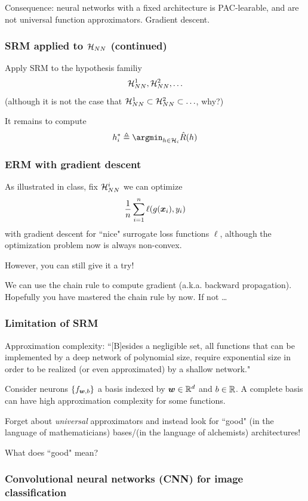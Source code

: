 \documentclass{article}
\begin{document}
Consequence: neural networks with a fixed architecture is PAC-learable, and are not universal function approximators.
Gradient descent.

\subsubsection{SRM applied to ${\mathcal H}_{NN}$ (continued)}

Apply SRM to the hypothesis familiy
\[
{\mathcal H}_{NN}^1, {\mathcal H}_{NN}^2, \ldots
\]
(although it is not the case that ${\mathcal H}_{NN}^1 \subset {\mathcal H}_{NN}^2 \subset \ldots$, why?)

It remains to compute
\[
h_i^* \triangleq \argmin_{h \in \calh_i} \hat{R} (h)
\]

\subsubsection{ERM with gradient descent}

As illustrated in class, fix ${\mathcal H}_{NN}^i$ we can optimize
\[
\frac1n \sum_{i = 1}^n \ell(g({\bm x}_i), y_i)
\]
with gradient descent for ``nice" surrogate loss functions $\ell$, although the optimization problem now is always non-convex.

However, you can still give it a try!

We can use the chain rule to compute gradient (a.k.a. backward propagation).
Hopefully you have mastered the chain rule by now. If not \ldots

\subsubsection{Limitation of SRM}

Approximation complexity:
``[B]esides a negligible set, all functions that can be implemented by a deep network of polynomial size, require exponential size in order to be realized (or even approximated) by a shallow network."\cite{cohen2016expressive}

Consider neurons $\{f_{{\bm w}, b}\}$ a basis indexed by ${\bm w} \in {\mathbb R}^d$ and $b \in {\mathbb R}$.
A complete basis can have high approximation complexity for some functions.

Forget about \emph{universal} approximators and instead look for ``good" (in the language of mathematicians) bases/(in the language of alchemists) architectures!

What does ``good" mean?

\subsubsection{Convolutional neural networks (CNN) for image classification}
\end{document}
